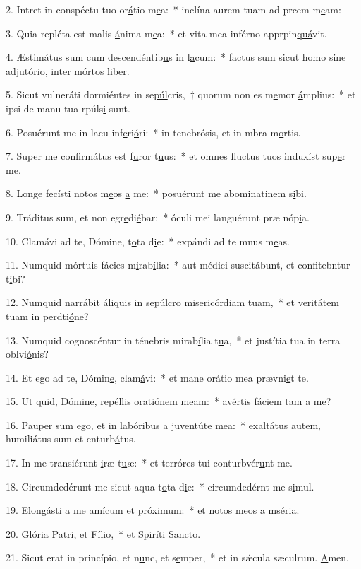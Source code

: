 2. Intret in conspéctu tuo or\uline{á}tio m\uline{e}a:~* inclína aurem tuam ad prcem m\uline{e}am:\par 
3. Quia repléta est malis \uline{á}nima m\uline{e}a:~* et vita mea inférno apprpin\uline{quá}vit.\par 
4. Æstimátus sum cum descendéntib\uline{u}s in l\uline{a}cum:~* factus sum sicut homo sine adjutório, inter mórtos l\uline{i}ber.\par 
5. Sicut vulneráti dormiéntes in se\uline{púl}cris,~† quorum non es m\uline{e}mor \uline{á}mplius:~* et ipsi de manu tua rpúls\uline{i} sunt.\par 
6. Posuérunt me in lacu inf\uline{e}ri\uline{ó}ri:~* in tenebrósis, et in mbra m\uline{o}rtis.\par 
7. Super me confirmátus est f\uline{u}ror t\uline{u}us:~* et omnes fluctus tuos induxíst sup\uline{e}r me.\par 
8. Longe fecísti notos m\uline{e}os \uline{a} me:~* posuérunt me abominatinem s\uline{i}bi.\par 
9. Tráditus sum, et non egr\uline{e}di\uline{é}bar:~* óculi mei languérunt præ nóp\uline{i}a.\par 
10. Clamávi ad te, Dómine, t\uline{o}ta d\uline{i}e:~* expándi ad te mnus m\uline{e}as.\par 
11. Numquid mórtuis fácies m\uline{i}rab\uline{í}lia:~* aut médici suscitábunt, et confitebntur t\uline{i}bi?\par 
12. Numquid narrábit áliquis in sepúlcro miseric\uline{ó}rdiam t\uline{u}am,~* et veritátem tuam in perdti\uline{ó}ne?\par 
13. Numquid cognoscéntur in ténebris mirab\uline{í}lia t\uline{u}a,~* et justítia tua in terra oblvi\uline{ó}nis?\par 
14. Et ego ad te, Dómin\uline{e}, clam\uline{á}vi:~* et mane orátio mea prævni\uline{e}t te.\par 
15. Ut quid, Dómine, repéllis orati\uline{ó}nem m\uline{e}am:~* avértis fáciem tam \uline{a} me?\par 
16. Pauper sum ego, et in labóribus a juvent\uline{ú}te m\uline{e}a:~* exaltátus autem, humiliátus sum et cnturb\uline{á}tus.\par 
17. In me transiérunt \uline{i}ræ t\uline{u}æ:~* et terróres tui conturbvér\uline{u}nt me.\par 
18. Circumdedérunt me sicut aqua t\uline{o}ta d\uline{i}e:~* circumdedérnt me s\uline{i}mul.\par 
19. Elongásti a me am\uline{í}cum et pr\uline{ó}ximum:~* et notos meos a msér\uline{i}a.\par 
20. Glória P\uline{a}tri, et F\uline{í}lio,~* et Spiríti S\uline{a}ncto.\par 
21. Sicut erat in princípio, et n\uline{u}nc, et s\uline{e}mper,~* et in sǽcula sæculrum. \uline{A}men.\par 
